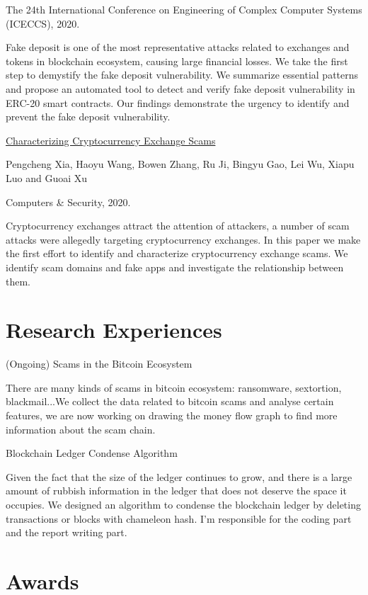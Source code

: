 \documentclass{article}
\begin{document}
The 24th International Conference on Engineering of Complex Computer Systems (ICECCS), 2020.

Fake deposit is one of the most representative attacks related to exchanges and tokens in blockchain ecosystem, causing large financial losses. We take the first step to demystify the fake deposit vulnerability. We summarize essential patterns and propose an automated tool to detect and verify fake deposit vulnerability in ERC-20 smart contracts. Our findings demonstrate the urgency to identify and prevent the fake deposit vulnerability.

\ralewaysb  \href{https://arxiv.org/pdf/2003.07314.pdf}{Characterizing Cryptocurrency Exchange Scams}\raleway

Pengcheng Xia, Haoyu Wang, Bowen Zhang, Ru Ji, Bingyu Gao, Lei Wu, Xiapu Luo and Guoai Xu

Computers \& Security, 2020.

Cryptocurrency exchanges attract the attention of attackers, a number of scam attacks were allegedly targeting cryptocurrency exchanges. In this paper we make the first effort to identify and characterize cryptocurrency exchange scams. We identify scam domains and fake apps and investigate the relationship between them.

\section{Research Experiences}



\ralewaysb (Ongoing) Scams in the Bitcoin Ecosystem

\raleway There are many kinds of scams in bitcoin ecosystem: ransomware, sextortion, blackmail...We collect the data related to bitcoin scams and analyse certain features, we are now working on drawing the money flow graph to find more information about the scam chain.


\ralewaysb Blockchain Ledger Condense Algorithm

\raleway Given the fact that the size of the ledger continues to grow, and there is a large amount of rubbish information in the ledger that does not deserve the space it occupies. We designed an algorithm to condense the blockchain ledger by  deleting transactions or blocks with chameleon hash. I'm responsible for the coding part and the report writing part.

\section{Awards}
\end{document}
